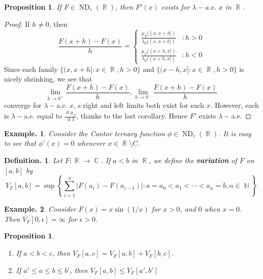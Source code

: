 \documentclass[12pt, a4paper]{memoir}
\DeclareMathOperator{\N}{{\mathbb{N}}}
\DeclareMathOperator{\R}{{\mathbb{R}}}
\DeclareMathOperator{\C}{{\mathbb{C}}}
\newtheorem{proposition}[theorem]{Proposition}
\theoremstyle{nonumberplain}
\newtheorem{definition}{Definition.}
\newtheorem{example}{Example.}
\newtheorem{proof}{Proof}
\renewcommand{\d}[1]{\ensuremath{\operatorname{d}\!{#1}}} %
\DeclareMathOperator{\ND}{ND}
\begin{document}
\begin{proposition}
    If $F\in\ND_r(\R)$, then $F'(x)$ exists for $\lambda-$a.e. $x$ in $\R$.
\end{proposition}
\begin{proof}
    If $h\neq 0$, then
    \begin{equation*}
        \frac{F(x+h)-F(x)}{h}=
        \begin{cases}
            \frac{\mu_F((x,x+h])}{\lambda_d((x,x+h])}&:h>0\\
            \frac{\mu_F((x+h,x])}{\lambda_d((x+h,x])}&:h<0
        \end{cases}
    \end{equation*}
    Since each family $\{(x,x+h]:x\in\R,h>0\}$ and $\{(x-h,x]:x\in\R,h>0\}$ is nicely shrinking, we see that
    \begin{equation*}
        \lim_{h\to 0^+}\frac{F(x+h)-F(x)}{h},\lim_{h\to 0^-}\frac{F(x+h)-F(x)}{h}
    \end{equation*}
    converge for $\lambda-$a.e. $x$, s right and left limits both exist for such $x$.
    However, each is $\lambda-$a.e. equal to $\frac{\d{\mu_F}}{\d{\lambda}}$, thanks to the last corollary.
    Hence $F'$ exists $\lambda-$a.e.
\end{proof}
\begin{example}
    Consider the Cantor ternary function $\phi\in\ND_r(\R)$.
    It is easy to see that $\phi'(x)=0$ whenever $x\in\R\setminus C$.
\end{example}
\begin{definition}
    Let $F:\R\to\C$.
    If $a<b$ in $\R$, we define the \textbf{variation} of $F$ on $[a,b]$ by
    \begin{equation*}
        V_F[a,b]=\sup\left\{\sum_{i=1}^n|F(a_i)-F(a_{i-1})|:a=a_0<a_1<\cdots<a_n=b,n\in\N\right\}
    \end{equation*}
\end{definition}
\begin{example}
    Consider $F(x)=x\sin(1/x)$ for $x>0$, and $0$ when $x=0$.
    Then $V_F[0,\epsilon]=\infty$ for $\epsilon>0$.
\end{example}
\begin{proposition}
    \begin{enumerate}[nl,r]
        \item If $a<b<c$, then $V_F[a,c]=V_F[a,b]+V_F[b,c]$.
        \item If $a'\leq a\leq b\leq b'$, then $V_F[a,b]\leq V_F[a',b']$
    \end{enumerate}
\end{proposition}
\end{document}
